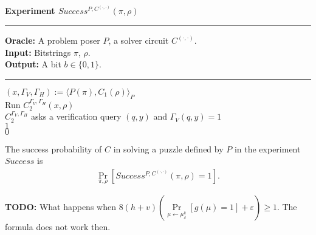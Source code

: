 %
\begin{codeblock}
  \textbf{Experiment $Success^{P, C^{(\cdot, \cdot)}}(\pi, \rho) $}
  \medskip
  \hrule
  \medskip
  \textbf{Oracle:} A problem poser $P$, a solver circuit $C^{(\cdot,\cdot)}$.\\
  \textbf{Input:}  Bitstrings $\pi$, $\rho$.\\
  \textbf{Output:} A bit $b \in \{0,1\}$.
  \medskip\hrule\medskip
  $(x, \Gamma_V, \Gamma_H) := \langle P(\pi), C_1(\rho) \rangle_{P}$ \\
  Run $C_2^{\Gamma_V,\Gamma_H}(x, \rho)$ \\
  \IndI \If $C_2^{\Gamma_V, \Gamma_H}$ asks a verification query $(q, y)$ and $\Gamma_V(q, y) = 1$ \then \\
  \IndII \return $1$ \\
  \return $0$ \\
\end{codeblock}
%
The success probability of $C$ in solving a puzzle defined by $P$ in the experiment $Success$ is
\begin{align}
 \underset{\pi, \rho}{\Pr}[Success^{P,C^{(\cdot, \cdot)}}(\pi, \rho) = 1].
\end{align}
%
\begin{todo}
  \textbf{TODO:} What happens when $8(h+v) \left(\underset{\mu \leftarrow \mu_\delta^k}{\Pr}[g(\mu) = 1] + \varepsilon\right) \geq 1$. The formula does not work then.\\
\end{todo}
%
